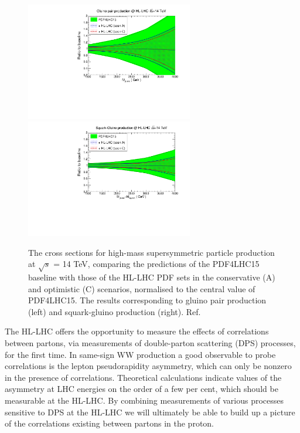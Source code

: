 \documentclass{article}
\begin{document}
\begin{figure}
\hskip-1.5cm
\includegraphics[width=0.65\textwidth]{gluinopair.pdf}
\includegraphics[width=0.65\textwidth]{squarkgluino.pdf}
\caption{\label{Fig:HLLHC_kin} The cross sections for high-mass supersymmetric particle production at $\sqrt{s}$ = 14 TeV, comparing the predictions of the PDF4LHC15 baseline with those of the HL-LHC PDF sets in the conservative (A) and optimistic (C) scenarios, normalised to the central value of PDF4LHC15. The results corresponding to gluino pair production (left) and squark-gluino production (right). Ref.~\cite{Khalek:2018mdn}}
\end{figure}

\vspace{5mm}
\noindent
The HL-LHC offers the opportunity to measure the effects of correlations between partons, via measurements of double-parton scattering (DPS) processes, for the first time. In same-sign WW production a good
observable to probe correlations is the lepton pseudorapidity asymmetry, which can only be nonzero in the presence of correlations. Theoretical calculations indicate values of the asymmetry at LHC energies on the
order of a few per cent, which should be measurable at the HL-LHC. By combining measurements of various processes sensitive to DPS at the HL-LHC we will ultimately be able to build up a picture of the correlations existing between partons in the proton.
\end{document}
